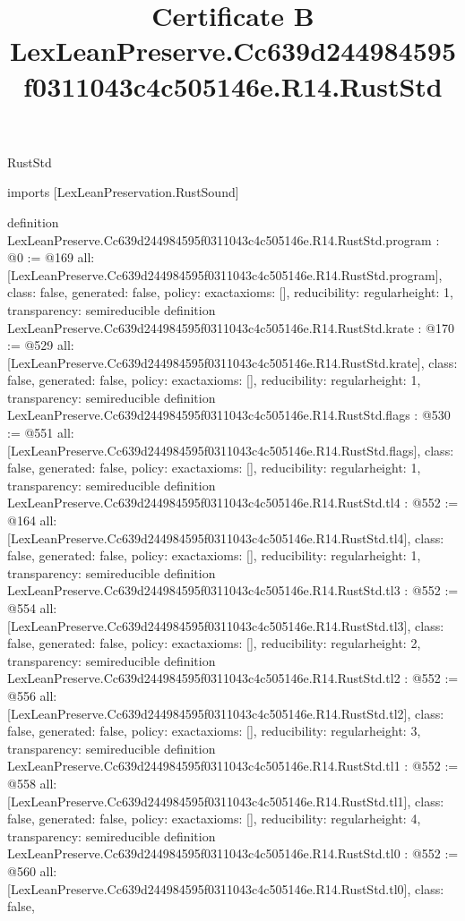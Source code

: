 \begin{lexlean}{RustStd}
\title{Certificate B LexLeanPreserve.Cc639d244984595f0311043c4c505146e.R14.RustStd}
\begin{coremodule}
imports [LexLeanPreservation.RustSound]

definition LexLeanPreserve.Cc639d244984595f0311043c4c505146e.R14.RustStd.program : @0 := @169 {
  all: [LexLeanPreserve.Cc639d244984595f0311043c4c505146e.R14.RustStd.program],
  class: false,
  generated: false,
  policy: exact{axioms: []},
  reducibility: regular{height: 1},
  transparency: semireducible
}
definition LexLeanPreserve.Cc639d244984595f0311043c4c505146e.R14.RustStd.krate : @170 := @529 {
  all: [LexLeanPreserve.Cc639d244984595f0311043c4c505146e.R14.RustStd.krate],
  class: false,
  generated: false,
  policy: exact{axioms: []},
  reducibility: regular{height: 1},
  transparency: semireducible
}
definition LexLeanPreserve.Cc639d244984595f0311043c4c505146e.R14.RustStd.flags : @530 := @551 {
  all: [LexLeanPreserve.Cc639d244984595f0311043c4c505146e.R14.RustStd.flags],
  class: false,
  generated: false,
  policy: exact{axioms: []},
  reducibility: regular{height: 1},
  transparency: semireducible
}
definition LexLeanPreserve.Cc639d244984595f0311043c4c505146e.R14.RustStd.tl4 : @552 := @164 {
  all: [LexLeanPreserve.Cc639d244984595f0311043c4c505146e.R14.RustStd.tl4],
  class: false,
  generated: false,
  policy: exact{axioms: []},
  reducibility: regular{height: 1},
  transparency: semireducible
}
definition LexLeanPreserve.Cc639d244984595f0311043c4c505146e.R14.RustStd.tl3 : @552 := @554 {
  all: [LexLeanPreserve.Cc639d244984595f0311043c4c505146e.R14.RustStd.tl3],
  class: false,
  generated: false,
  policy: exact{axioms: []},
  reducibility: regular{height: 2},
  transparency: semireducible
}
definition LexLeanPreserve.Cc639d244984595f0311043c4c505146e.R14.RustStd.tl2 : @552 := @556 {
  all: [LexLeanPreserve.Cc639d244984595f0311043c4c505146e.R14.RustStd.tl2],
  class: false,
  generated: false,
  policy: exact{axioms: []},
  reducibility: regular{height: 3},
  transparency: semireducible
}
definition LexLeanPreserve.Cc639d244984595f0311043c4c505146e.R14.RustStd.tl1 : @552 := @558 {
  all: [LexLeanPreserve.Cc639d244984595f0311043c4c505146e.R14.RustStd.tl1],
  class: false,
  generated: false,
  policy: exact{axioms: []},
  reducibility: regular{height: 4},
  transparency: semireducible
}
definition LexLeanPreserve.Cc639d244984595f0311043c4c505146e.R14.RustStd.tl0 : @552 := @560 {
  all: [LexLeanPreserve.Cc639d244984595f0311043c4c505146e.R14.RustStd.tl0],
  class: false,
}
\end{coremodule}
\end{lexlean}
